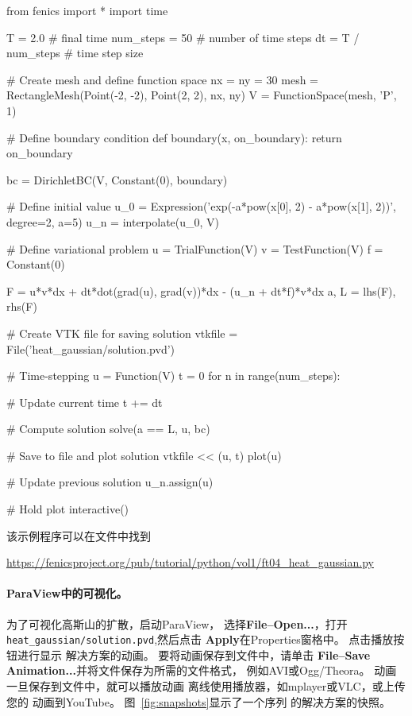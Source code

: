 \begin{python}
from fenics import *
import time

T = 2.0            # final time
num_steps = 50     # number of time steps
dt = T / num_steps # time step size

# Create mesh and define function space
nx = ny = 30
mesh = RectangleMesh(Point(-2, -2), Point(2, 2), nx, ny)
V = FunctionSpace(mesh, 'P', 1)

# Define boundary condition
def boundary(x, on_boundary):
    return on_boundary

bc = DirichletBC(V, Constant(0), boundary)

# Define initial value
u_0 = Expression('exp(-a*pow(x[0], 2) - a*pow(x[1], 2))',
                 degree=2, a=5)
u_n = interpolate(u_0, V)

# Define variational problem
u = TrialFunction(V)
v = TestFunction(V)
f = Constant(0)

F = u*v*dx + dt*dot(grad(u), grad(v))*dx - (u_n + dt*f)*v*dx
a, L = lhs(F), rhs(F)

# Create VTK file for saving solution
vtkfile = File('heat_gaussian/solution.pvd')

# Time-stepping
u = Function(V)
t = 0
for n in range(num_steps):

    # Update current time
    t += dt

    # Compute solution
    solve(a == L, u, bc)

    # Save to file and plot solution
    vtkfile << (u, t)
    plot(u)

    # Update previous solution
    u_n.assign(u)

# Hold plot
interactive()
\end{python}
该示例程序可以在文件中找到
\begin{center}
  \url{https://fenicsproject.org/pub/tutorial/python/vol1/ft04_heat_gaussian.py}
\end{center}


\paragraph{ParaView中的可视化。}
为了可视化高斯山的扩散，启动ParaView，
选择\textbf{File--Open...}，打开
\verb!heat_gaussian/solution.pvd!,然后点击
\textbf{Apply}在Properties窗格中。 点击播放按钮进行显示
解决方案的动画。 要将动画保存到文件中，请单击
\textbf{File--Save Animation...}并将文件保存为所需的文件格式，
例如AVI或Ogg/Theora。
动画一旦保存到文件中，就可以播放动画
离线使用播放器，如mplayer或VLC，或上传您的
动画到YouTube。 图~\ref{fig:snapshots}显示了一个序列
的解决方案的快照。

